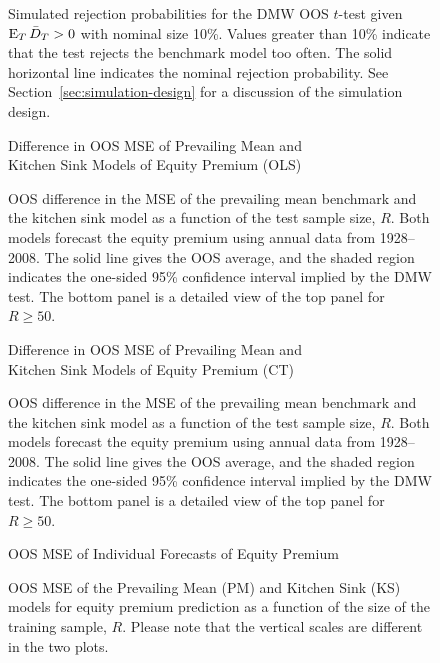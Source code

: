 \documentclass[12pt]{article}
\begin{document}
\begin{figure}
   
  \caption{Simulated rejection probabilities for the DMW
    OOS $t$-test given $\operatorname{E}_T \bar{D}_{T} > 0$ with nominal
    size 10\%.  Values greater than 10\% indicate that the test
    rejects the benchmark model too often.  The solid horizontal line
    indicates the nominal rejection probability.  See
    Section~\ref{sec:simulation-design} for a discussion of the
    simulation design.}
  \label{fig:ttest-power}
\end{figure}

\begin{figure}
\centering
\large{Difference in OOS MSE of Prevailing Mean and\\ Kitchen
    Sink Models of Equity Premium (OLS)}
\caption{OOS difference in the MSE
  of the prevailing mean benchmark and the kitchen sink model as a
  function of the test sample size, $R$.  Both models forecast the
  equity premium using annual data from 1928--2008.  The solid line
  gives the OOS average, and the shaded region indicates the
  one-sided 95\% confidence interval implied by the
  DMW test.  The bottom panel is a detailed view of the top
  panel for $R \geq 50$.}
\label{fig:empirics1}
\end{figure}

\begin{figure}
\centering
\large{Difference in OOS MSE of Prevailing Mean and\\ Kitchen
    Sink Models of Equity Premium (CT)}
\caption{OOS difference in the MSE
  of the prevailing mean benchmark and the kitchen sink model as a
  function of the test sample size, $R$.  Both models forecast the
  equity premium using annual data from 1928--2008.  The solid line
  gives the OOS average, and the shaded region indicates the
  one-sided 95\% confidence interval implied by the 
  DMW test.  The bottom panel is a detailed view of the top
  panel for $R \geq 50$.}
\label{fig:empirics2}
\end{figure}

\begin{figure}
\centering
\large{OOS MSE of Individual Forecasts of Equity Premium}
\caption{OOS MSE of the Prevailing Mean (PM) and
    Kitchen Sink (KS) models for equity premium prediction as
    a function of the size of the training sample, $R$.  Please note
    that the vertical scales are different in the two plots.}
\label{fig:empirics3}
\end{figure}
\end{document}
